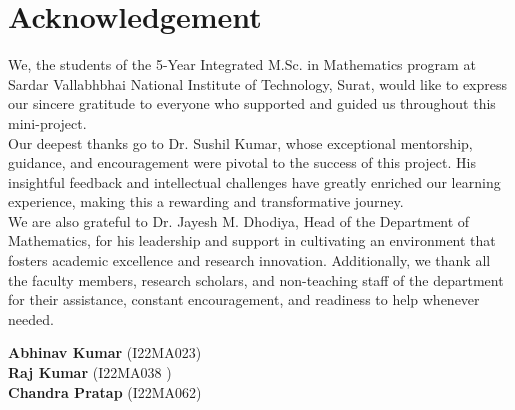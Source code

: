 \chapter*{Acknowledgement}%

	
We, the students of the 5-Year Integrated M.Sc. in Mathematics program at Sardar Vallabhbhai National Institute of Technology, Surat, would like to express our sincere gratitude to everyone who supported and guided us throughout this mini-project.\\

Our deepest thanks go to Dr. Sushil Kumar, whose exceptional mentorship, guidance, and encouragement were pivotal to the success of this project. His insightful feedback and intellectual challenges have greatly enriched our learning experience, making this a rewarding and transformative journey. \\

We are also grateful to Dr. Jayesh M. Dhodiya, Head of the Department of Mathematics, for his leadership and support in cultivating an environment that fosters academic excellence and research innovation. Additionally, we thank all the faculty members, research scholars, and non-teaching staff of the department for their assistance, constant encouragement, and readiness to help whenever needed.

\vspace{0.8cm}
\raggedright
\textbf{Abhinav Kumar} (I22MA023) \\ [0.3cm]
\textbf{Raj Kumar} (I22MA038 ) \\ [0.3cm]
\textbf{Chandra Pratap} (I22MA062)

